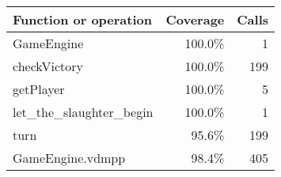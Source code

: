 \bigskip
\begin{longtable}{|l|r|r|}
\hline
Function or operation & Coverage & Calls \\
\hline
\hline
GameEngine & 100.0\% & 1 \\
\hline
checkVictory & 100.0\% & 199 \\
\hline
getPlayer & 100.0\% & 5 \\
\hline
let\_the\_slaughter\_begin & 100.0\% & 1 \\
\hline
turn & 95.6\% & 199 \\
\hline
\hline
GameEngine.vdmpp & 98.4\% & 405 \\
\hline
\end{longtable}

